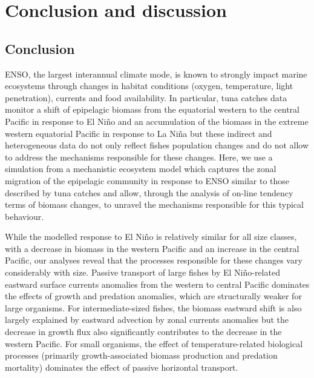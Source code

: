 \section{Conclusion and discussion}
\label{sec:conclusion}


\subsection{Conclusion}

ENSO, the largest interannual climate mode, is known to strongly impact marine ecosystems through changes in habitat conditions (oxygen, temperature, light penetration), currents and food availability. In particular, tuna catches data monitor a shift of epipelagic biomass from the equatorial western to the central Pacific in response to El Niño and an accumulation of the biomass in the extreme western equatorial Pacific in response to La Niña but these indirect and heterogeneous data do not only reflect fishes population changes and do not allow to address the mechanisms responsible for these changes. Here, we use a simulation from a mechanistic ecosystem model which captures the zonal migration of the epipelagic community in response to ENSO similar to those described by tuna catches  and allow, through the analysis of on-line tendency terms of biomass changes, to unravel the mechanisms responsible for this typical behaviour.

While the modelled response to El Niño is relatively similar for all size classes, with a decrease in biomass in the western Pacific and an increase in the central Pacific, our analyses reveal that the processes responsible for these changes vary considerably with size. Passive transport of large fishes by El Niño-related eastward surface currents anomalies from the western to central Pacific dominates the effects of growth and predation anomalies, which are structurally weaker for large organisms. For intermediate-sized fishes, the biomass eastward shift is also largely explained by eastward advection by zonal currents anomalies but the decrease in growth flux also significantly contributes to the decrease in the western Pacific. For small organisms, the effect of temperature-related biological processes (primarily growth-associated biomass production and predation mortality) dominates the effect of passive horizontal transport.


